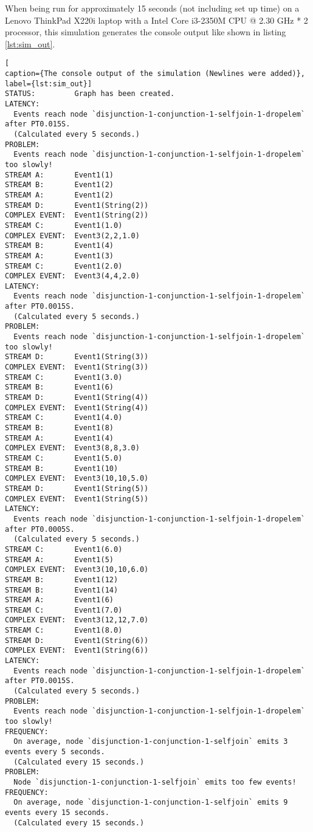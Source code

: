\documentclass[article, type=bsc, colorback, accentcolor=tud8b, parskip=half, bibliography=totocnumbered]{tudthesis}
\begin{document}
When being run for approximately 15 seconds (not including set up time) on a Lenovo ThinkPad X220i laptop with a Intel Core i3-2350M CPU @ 2.30 GHz * 2 processor, this simulation generates the console output like shown in listing \ref{lst:sim_out}.

\begin{lstlisting}[
caption={The console output of the simulation (Newlines were added)},
label={lst:sim_out}]
STATUS:         Graph has been created.
LATENCY:
  Events reach node `disjunction-1-conjunction-1-selfjoin-1-dropelem` after PT0.015S.
  (Calculated every 5 seconds.)
PROBLEM:
  Events reach node `disjunction-1-conjunction-1-selfjoin-1-dropelem` too slowly!
STREAM A:       Event1(1)
STREAM B:       Event1(2)
STREAM A:       Event1(2)
STREAM D:       Event1(String(2))
COMPLEX EVENT:  Event1(String(2))
STREAM C:       Event1(1.0)
COMPLEX EVENT:  Event3(2,2,1.0)
STREAM B:       Event1(4)
STREAM A:       Event1(3)
STREAM C:       Event1(2.0)
COMPLEX EVENT:  Event3(4,4,2.0)
LATENCY:
  Events reach node `disjunction-1-conjunction-1-selfjoin-1-dropelem` after PT0.0015S.
  (Calculated every 5 seconds.)
PROBLEM:
  Events reach node `disjunction-1-conjunction-1-selfjoin-1-dropelem` too slowly!
STREAM D:       Event1(String(3))
COMPLEX EVENT:  Event1(String(3))
STREAM C:       Event1(3.0)
STREAM B:       Event1(6)
STREAM D:       Event1(String(4))
COMPLEX EVENT:  Event1(String(4))
STREAM C:       Event1(4.0)
STREAM B:       Event1(8)
STREAM A:       Event1(4)
COMPLEX EVENT:  Event3(8,8,3.0)
STREAM C:       Event1(5.0)
STREAM B:       Event1(10)
COMPLEX EVENT:  Event3(10,10,5.0)
STREAM D:       Event1(String(5))
COMPLEX EVENT:  Event1(String(5))
LATENCY:
  Events reach node `disjunction-1-conjunction-1-selfjoin-1-dropelem` after PT0.0005S.
  (Calculated every 5 seconds.)
STREAM C:       Event1(6.0)
STREAM A:       Event1(5)
COMPLEX EVENT:  Event3(10,10,6.0)
STREAM B:       Event1(12)
STREAM B:       Event1(14)
STREAM A:       Event1(6)
STREAM C:       Event1(7.0)
COMPLEX EVENT:  Event3(12,12,7.0)
STREAM C:       Event1(8.0)
STREAM D:       Event1(String(6))
COMPLEX EVENT:  Event1(String(6))
LATENCY:
  Events reach node `disjunction-1-conjunction-1-selfjoin-1-dropelem` after PT0.0015S.
  (Calculated every 5 seconds.)
PROBLEM:
  Events reach node `disjunction-1-conjunction-1-selfjoin-1-dropelem` too slowly!
FREQUENCY:
  On average, node `disjunction-1-conjunction-1-selfjoin` emits 3 events every 5 seconds.
  (Calculated every 15 seconds.)
PROBLEM:
  Node `disjunction-1-conjunction-1-selfjoin` emits too few events!
FREQUENCY:
  On average, node `disjunction-1-conjunction-1-selfjoin` emits 9 events every 15 seconds.
  (Calculated every 15 seconds.)
\end{lstlisting}
\end{document}
